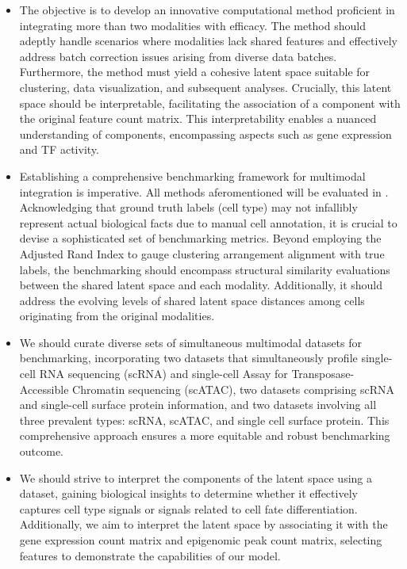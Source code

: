 \begin{itemize}
	\item
	The objective is to develop an innovative computational method proficient in integrating more than two modalities with efficacy. The method should adeptly handle scenarios where modalities lack shared features and effectively address batch correction issues arising from diverse data batches. Furthermore, the method must yield a cohesive latent space suitable for clustering, data visualization, and subsequent analyses. Crucially, this latent space should be interpretable, facilitating the association of a component with the original feature count matrix. This interpretability enables a nuanced understanding of components, encompassing aspects such as gene expression and TF activity.
	\item
	Establishing a comprehensive benchmarking framework for multimodal integration is imperative. All methods aferomentioned  will be evaluated in . Acknowledging that ground truth labels (cell type) may not infallibly represent actual biological facts due to manual cell annotation, it is crucial to devise a sophisticated set of benchmarking metrics. Beyond employing the Adjusted Rand Index to gauge clustering arrangement alignment with true labels, the benchmarking should encompass structural similarity evaluations between the shared latent space and each modality. Additionally, it should address the evolving levels of shared latent space distances among cells originating from the original modalities.

	\item
	We should curate diverse sets of simultaneous multimodal datasets for benchmarking, incorporating two datasets that simultaneously profile single-cell RNA sequencing (scRNA) and single-cell Assay for Transposase-Accessible Chromatin sequencing (scATAC), two datasets comprising scRNA and single-cell surface protein information, and two datasets involving all three prevalent types: scRNA, scATAC, and single cell surface protein. This comprehensive approach ensures a more equitable and robust benchmarking outcome.

	\item
	We should strive to interpret the components of the latent space using a dataset, gaining biological insights to determine whether it effectively captures cell type signals or signals related to cell fate differentiation. Additionally, we aim to interpret the latent space by associating it with the gene expression count matrix and epigenomic peak count matrix, selecting features to demonstrate the capabilities of our model.
\end{itemize}
\FloatBarrier %

